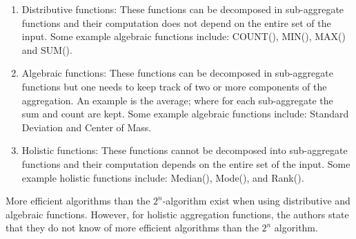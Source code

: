 \documentclass[]{article}
\begin{document}
\begin{enumerate}
    \item Distributive functions: These functions can be decomposed in sub-aggregate functions and their computation does not
    depend on the entire set of the input. Some example algebraic functions include: COUNT(), MIN(), MAX() and SUM().
    \item Algebraic functions: These functions can be decomposed in sub-aggregate functions but one needs to keep track of two
    or more components of the aggregation. An example is the average; where for each sub-aggregate the sum and count are kept.
    Some example algebraic functions include: Standard Deviation and Center of Mass.
    \item Holistic functions: These functions cannot be decomposed into sub-aggregate functions and their computation depends
    on the entire set of the input. Some example holistic functions include: Median(), Mode(), and Rank(). 
\end{enumerate}
More efficient algorithms than the $2^n$-algorithm exist when using distributive and algebraic functions. However, for
holistic aggregation functions, the authors state that they do not know of more efficient algorithms than the $2^n$ algorithm.
\end{document}

